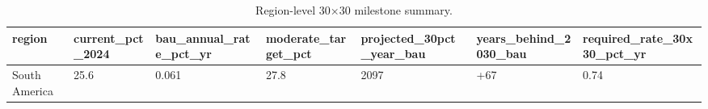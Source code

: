 \begin{table}[htbp]
\centering
\small
\begin{tabular}{lllllll}
\hline
region & current\_pct\_2024 & bau\_annual\_rate\_pct\_yr & moderate\_target\_pct & projected\_30pct\_year\_bau & years\_behind\_2030\_bau & required\_rate\_30x30\_pct\_yr \\
\hline
South America & 25.6 & 0.061 & 27.8 & 2097 & +67 & 0.74 \\
\hline
\end{tabular}
\caption{Region-level 30×30 milestone summary.}
\label{tab:pathway_milestone}
\end{table}